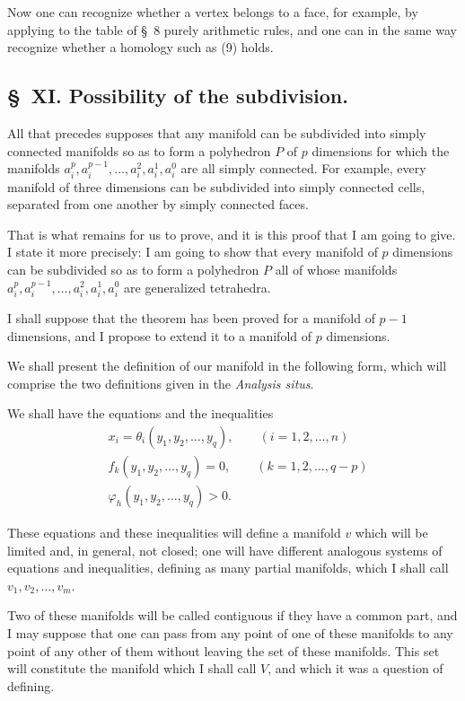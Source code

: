 \documentclass{article}
\begin{document}
Now one can recognize whether a vertex belongs to a face, for
example, by applying to the table of \S~8 purely arithmetic rules, and one can in the same way recognize whether a homology such as (9) holds.

\subsection*{\S~XI. Possibility of the subdivision.}

All that precedes supposes that any manifold can be subdivided into simply connected manifolds so as to form a polyhedron $P$ of $p$ dimensions for which the manifolds $a^{p}_{i}, a^{p-1}_{i}, \ldots, a^{2}_{i}, a^{1}_{i}, a^{0}_{i}$ are all simply connected. For example, every manifold of three dimensions can be subdivided into simply connected cells, separated from one another by simply connected faces.

That is what remains for us to prove, and it is this proof that I am going to give. I state it more precisely: I am going to show that every manifold of $p$ dimensions can be subdivided so as to form a polyhedron $P$ all of whose manifolds $a^{p}_{i}, a^{p-1}_{i}, \ldots, a^{2}_{i}, a^{1}_{i}, a^{0}_{i}$ are generalized tetrahedra.

I shall suppose that the theorem has been proved for a manifold of $p - 1$ dimensions, and I propose to extend it to a manifold of $p$ dimensions.

We shall present the definition of our manifold in the following form, which will comprise the two definitions given in the \emph{Analysis situs}.

We shall have the equations and the inequalities
\[ \begin{aligned} &x_{i} = \theta_{i}(y_{1}, y_{2}, \ldots, y_{q}), \qquad (i = 1, 2, \ldots, n)\\ &f_{k}(y_{1}, y_{2}, \ldots, y_{q}) = 0, \qquad (k = 1, 2, \ldots, q - p)\\ &\varphi_{h}(y_{1}, y_{2}, \ldots, y_{q}) > 0. \end{aligned} \tag{1} \]

These equations and these inequalities will define a manifold $v$ which will be limited and, in general, not closed; one will have different analogous systems of equations and inequalities, defining as many partial manifolds, which I shall call $v_{1}, v_{2}, \ldots, v_{m}$.


Two of these manifolds will be called contiguous if they have a common part, and I may suppose that one can pass from any point of one of these manifolds to any point of any other of them without leaving the set of these manifolds. This set will constitute the manifold which I shall call $V$, and which it was a question of defining.
\end{document}
